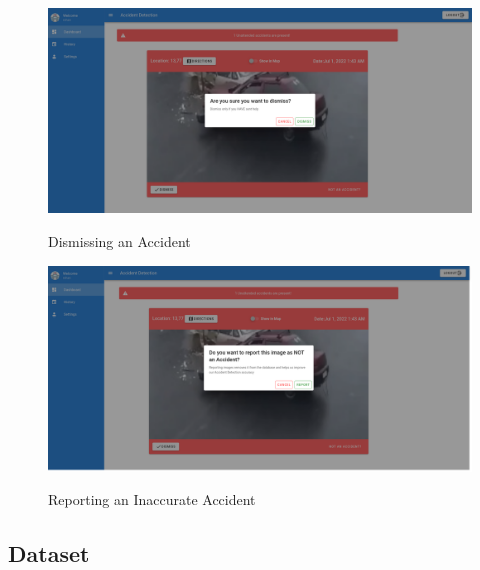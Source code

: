 \documentclass[ 12pt,a4paper,twocolumn,fleqn]{article}
\begin{document}
\begin{adjustwidth}{3.5em}{0pt}
\vspace*{\fill}
\begin{figure}[H]
\begin{center}
    \hspace*{0.4in}
    \includegraphics[scale=0.2]{media/dismiss.png}
    \\
  \caption{ Dismissing an Accident}
    
    \hspace{0.2cm}
\end{center}
\end{figure}

\begin{figure}[H]
\begin{center}
    \hspace*{0.4in}
    \includegraphics[scale=0.2]{media/report.png}
    \\
  \caption{ Reporting an Inaccurate Accident}
\end{center}
\end{figure}
\vfill 

\newpage
  \pagestyle{fancy}
  
\subsection{Dataset}


\end{adjustwidth}
\end{document}
